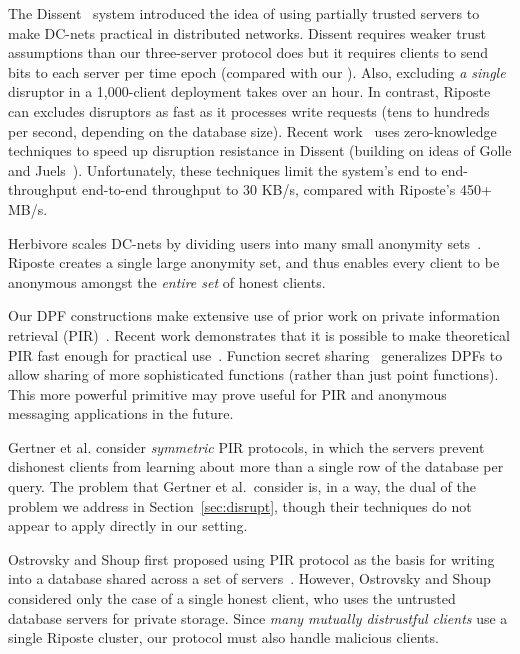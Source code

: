 \documentclass[10pt,twocolumn]{article}
\newcommand{\name}{Riposte\xspace}
\newcommand{\Name}{Riposte\xspace}
\begin{document}
The Dissent~\cite{wolinsky2012dissent} system
introduced the idea of using partially trusted servers to 
make DC-nets practical in distributed networks. 
Dissent requires weaker trust assumptions than our three-server
protocol does but it requires clients to send  bits
to each server per time epoch (compared with our ).
Also, excluding {\em a single} disruptor in a 1,000-client
deployment takes over an hour.
In contrast, \name can excludes disruptors as fast as it processes write
requests (tens to hundreds per second, depending on the database size).
Recent work~\cite{corrigangibbs2013proactively} uses
zero-knowledge techniques to speed up disruption resistance
in Dissent (building on ideas of Golle and Juels~\cite{golle2004dining}).
Unfortunately, these techniques limit the system's end to end-throughput
end-to-end throughput to 30 KB/s, compared with \name's 450+ MB/s.

Herbivore scales DC-nets by dividing users into many small anonymity
sets~\cite{goel2003herbivore}.
\Name creates a single large anonymity set, and thus enables
every client to be anonymous amongst the {\em entire set} of honest clients.




Our DPF constructions make extensive use
of prior work on private information
retrieval (PIR)~\cite{chor1998private,chor1997computationally,gasarch2004survey,gilboa2014distributed}.
Recent work demonstrates that it is possible to make
theoretical PIR fast enough for practical 
use~\cite{devet2014best,goldberg2007improving,demmler2014raid}.
Function secret sharing~\cite{boyle2015function} generalizes DPFs
to allow sharing of more sophisticated functions (rather than just
point functions).
This more powerful primitive may prove useful for PIR and anonymous
messaging applications in the future.

Gertner et al.\cite{gertner1998protecting} consider {\em symmetric}
PIR protocols, in which the servers prevent dishonest clients
from learning about more than a single row of the database per query.
The problem that Gertner et al.\ consider is, in a way, the dual 
of the problem we address in Section~\ref{sec:disrupt}, though
their techniques do not appear to apply directly in our setting.

Ostrovsky and Shoup first proposed
using PIR protocol as the basis for writing
into a database shared across a set of servers~\cite{ostrovsky1997private}.
However, Ostrovsky and Shoup
considered only the case of a single honest client, 
who uses the untrusted database servers for private storage. 
Since {\em many mutually distrustful clients} use a
single \name cluster, our protocol must also handle malicious clients.
\end{document}
